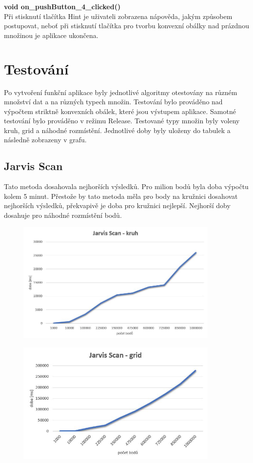 \documentclass[a4paper, 12pt]{article}
\begin{document}
\textbf{void on\_pushButton\_4\_clicked()}\\
Při stisknutí tlačítka Hint je uživateli zobrazena nápověda, jakým způsobem postupovat, neboť při stisknutí tlačítka pro tvorbu konvexní obálky nad prázdnou množinou je aplikace ukončena.
\\


\section{Testování}
Po vytvoření funkční aplikace byly jednotlivé algoritmy otestovány na různém množství dat a na různých typech množin. Testování bylo prováděno nad výpočtem striktně konvexních obálek, které jsou výstupem aplikace. Samotné testování bylo prováděno v režimu Release. Testované typy množin byly voleny kruh, grid a náhodné rozmístění. Jednotlivé doby byly uloženy do tabulek a následně zobrazeny v grafu. 

\subsection{Jarvis Scan}
Tato metoda dosahovala nejhorších výsledků. Pro milion bodů byla doba výpočtu kolem 5 minut. Přestože by tato metoda měla pro body na kružnici dosahovat nejhorších výsledků, překvapivě je doba pro kružnici nejlepší. Nejhorší doby dosahuje pro náhodné rozmístění bodů.





\begin{figure}[h!]
	\centering
	\includegraphics[width=10cm]{jarvis_kruh.jpg}
\end{figure}


\begin{figure}[h!]
	\centering
	\includegraphics[width=10cm]{jarvis_grid.jpg}
\end{figure}
\end{document}

